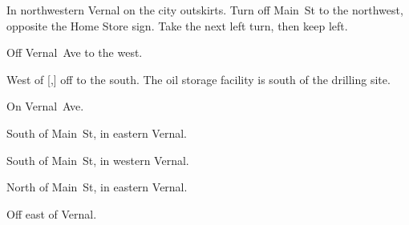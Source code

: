
\begin{LocationList}

In northwestern Vernal on the city outskirts.
Turn off   Main~St to the northwest, opposite the Home Store sign.
Take the next left turn, then keep left.

Off  Vernal~Ave to the west.

West of [,] off   to the south.
The oil storage facility is south of the drilling site.

\Location{\GarageHQ \Garage}
On  Vernal~Ave.

South of  Main~St, in eastern Vernal.

South of   Main~St, in western Vernal.

North of  Main~St, in eastern Vernal.

\Location{\TruckStop \Gas \Rest \Service \Weigh \SpecialTransport}
Off  east of Vernal.

\end{LocationList}
